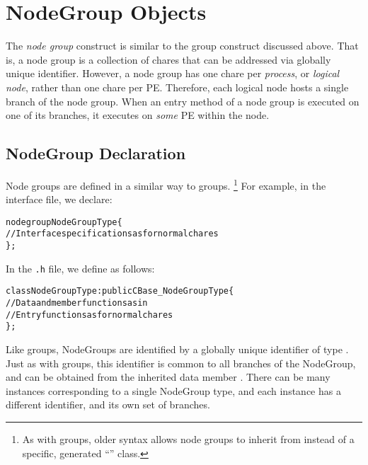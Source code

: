 \section{NodeGroup Objects}

The {\em node group} construct    is 
similar to the group construct discussed above. 
That is, a node group is a collection of chares that can be addressed via globally unique
identifier. 
However, a node group has one chare per {\em process}, or {\em logical node}, rather than one chare per PE.
Therefore, each logical node hosts a single branch of the
node group.  When an entry method of a
node group is executed on one of its branches, it executes on {\em some} PE within the node.

\subsection{NodeGroup Declaration} 

Node groups are defined in a similar way to groups.  \footnote{As with groups,
older syntax allows node groups to inherit from  instead of a
specific, generated ``'' class.} For example, in the interface file, we declare:

\begin{alltt}
 nodegroup NodeGroupType \{
  // Interface specifications as for normal chares
 \};
\end{alltt}

In the {\tt .h} file, we define  as follows:

\begin{alltt}
 class NodeGroupType : public CBase_NodeGroupType \{
  // Data and member functions as in \CC{}
  // Entry functions as for normal chares
 \};
\end{alltt}

Like groups, NodeGroups are identified by a globally unique identifier of type
.  Just as with groups, this identifier is
common to all branches of the NodeGroup, and can be obtained from the inherited
data member .
There can be many instances corresponding to a single NodeGroup
type, and each instance has a different identifier, and its own set of
branches.




